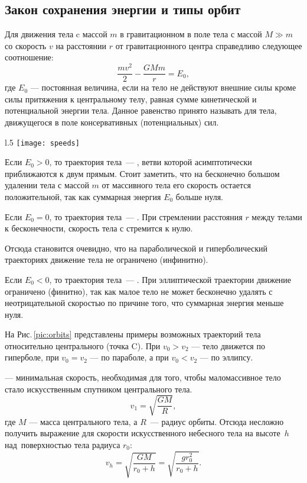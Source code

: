 \subsection{Закон сохранения энергии и типы орбит}
Для движения тела c массой $m$ в гравитационном  в поле тела 
с массой \linebreak $M\gg m$ со скорость $v$ на расстоянии $r$ от 
гравитационного центра справедливо следующее соотношение: 
\begin{equation}
\frac{m v^2}{2}-\frac{GM m }{r}=E_0,
\end{equation}
где $E_0$ --- постоянная величина, если на тело не действуют
внешние силы кроме силы притяжения к центральному телу, 
равная сумме кинетической и потенциальной энергии тела. Данное равенство принято называть  для тела, движущегося в поле консервативных (потенциальных) сил.

\begin{wrapfigure}[10]{l}{.5\tw}
	\centering
	\vspace{-1pc}
	\texttt{[image: speeds]}
	\caption{Возможные траектории тела \label{pic:orbits}}
\end{wrapfigure}
Если $E_0>0$, то траектория тела~--- , 
ветви которой асимптотически приближаются к двум прямым. Стоит заметить,
что на бесконечно большом удалении тела с массой $m$ от массивного тела
его скорость остается положительной, так как суммарная энергия $E_0$ 
больше нуля.

Если $E_0=0$, то траектория тела~--- . При стремлении
расстояния $r$ между телами к бесконечности, скорость тела с стремится к нулю.

Отсюда становится очевидно, что на параболической и гиперболический
 траекториях движение тела не ограничено (инфинитно). 

Если $E_0<0$, то траектория тела~--- . При 
эллиптической траектории движение ограничено (финитно), так как малое тело
не может бесконечно удалять с неотрицательной скоростью по причине того,
что суммарная энергия меньше нуля.

На Рис.\,\ref{pic:orbits} представлены примеры возможных траекторий тела 
относительно центрального (точка C). При $v_0 > v_{2}$ --- тело движется 
по гиперболе, при $v_0 = v_{2}$ --- по параболе, 
а при $v_0 < v_{2}$ --- по эллипсу.

 --- минимальная скорость, необходимая для 
того, чтобы маломассивное тело стало искусственным спутником центрального тела.
\begin{equation}v_1=\sqrt{\frac{GM}{R}},
\end{equation}
где $M$ --- масса центрального тела, а $R$~--- радиус орбиты. Отсюда несложно получить выражение для
скорости искусственного небесного тела на высоте~$h$ над~поверхностью тела радиуса $r_0$:
\begin{equation}
v_h=\sqrt{\frac{GM}{r_0+h}}=\sqrt{\frac{g r_0^2}{r_0+h}}.
\end{equation}

